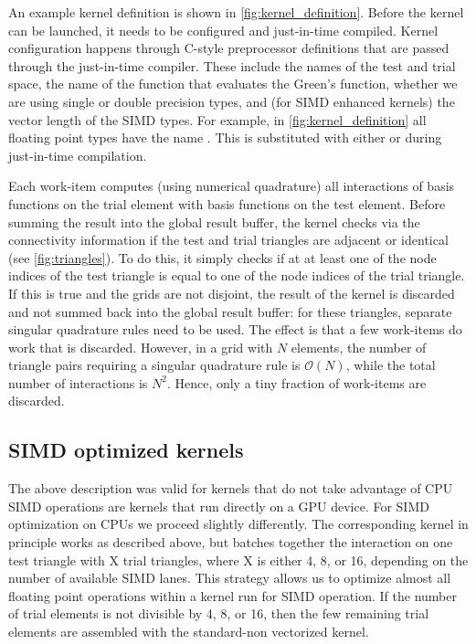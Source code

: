 An example kernel definition is shown in \cref{fig:kernel_definition}.
Before the kernel can be launched, it needs to be configured and just-in-time compiled. Kernel configuration happens through C-style preprocessor definitions that are passed through the just-in-time compiler. These include the names of the test and trial space, the name of the function that evaluates the Green's function, whether we are using single or double precision types, and (for SIMD enhanced kernels) the vector length of the SIMD types.
For example, in \cref{fig:kernel_definition} all floating point types have the name . This is substituted with either  or  during just-in-time compilation.

Each work-item computes (using numerical quadrature) all interactions of basis functions on the trial element with basis functions on the test element. Before summing the result into the global result buffer, the kernel checks via the connectivity information if the test and trial triangles are adjacent or identical (see \cref{fig:triangles}). To do this, it simply checks if at at least one of the node indices of the test triangle is equal to one of the node indices of the trial triangle. If this is true and the grids are not disjoint, the result of the kernel is discarded and not summed back into the global result buffer: for these triangles, separate singular quadrature rules need to be used. The effect is that a few work-items do work that is discarded. However, in a grid with $N$ elements, the number of triangle pairs requiring a singular quadrature rule is $\mathcal{O}(N)$, while the total number of interactions is $N^2$. Hence, only a tiny fraction of work-items are discarded.

\subsection{SIMD optimized kernels}

The above description was valid for kernels that do not take advantage of CPU SIMD operations are kernels that run directly on a GPU device. For SIMD optimization on CPUs we proceed slightly differently. The corresponding kernel in principle works as described above, but batches together the interaction on one test triangle with X trial triangles, where X is either 4, 8, or 16, depending on the number of available SIMD lanes. This strategy allows us to optimize almost all floating point operations within a kernel run for SIMD operation. If the number of trial elements is not divisible by 4, 8, or 16, then the few remaining trial elements are assembled with the standard-non vectorized kernel.

